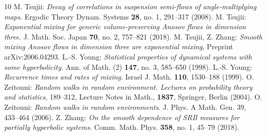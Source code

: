 \begin{thebibliography}{10}
  M. Tsujii: {\em Decay of correlations in suspension semi-flows of angle-multiplying maps}. Ergodic Theory Dynam. Systems {\bf 28}, no. 1, 291--317 (2008).
  M. Tsujii: {\em Exponential mixing for generic volume-preserving Anosov flows in dimension three}. J. Math. Soc. Japan {\bf 70}, no. 2, 757--821  (2018).
  M. Tsujii, Z. Zhang: {\em Smooth mixing Anosov flows in dimension three are exponential mixing}, Preprint  arXiv:2006.04293. 
 L.-S. Young: {\em Statistical properties of dynamical systems with some hyperbolicity}. Ann. of Math. (2) {\bf 147}, no. 3, 585--650 (1998).
 L.-S. Young: {\em Recurrence times and rates of mixing}. Israel J. Math. {\bf 110}, 1530--188 (1999).
 O. Zeitouni: {\em Random walks in random environment. Lectures on probability theory and statistics}, 189--312,
Lecture Notes in Math., {\bf 1837}, Springer, Berlin (2004). 
 O. Zeitouni: {\em Random walks in random environments}. J. Phys. A Math. Gen. 39, 433--464 (2006).
 Z. Zhang: {\em On the smooth dependence of SRB measures for partially hyperbolic systems}. Comm. Math. Phys. {\bf 358}, no. 1, 45--79 (2018).
\end{thebibliography}